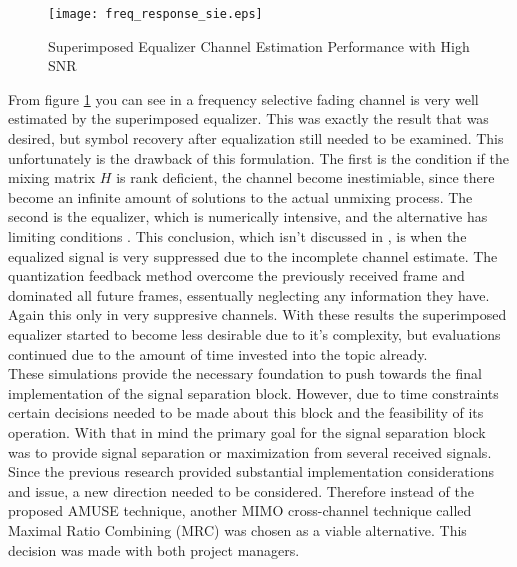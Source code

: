 \begin{figure}[!ht]\label{sie_freq}
\centering
\texttt{[image: freq\_response\_sie.eps]}
\caption{Superimposed Equalizer Channel Estimation Performance with High SNR}
\end{figure}

%

From figure \ref{sie_freq} you can see in a frequency selective fading channel is very well estimated by the superimposed equalizer.  This was exactly the result that was desired, but symbol recovery after equalization still needed to be examined. This unfortunately is the drawback of this formulation.  The first is the condition if the mixing matrix \(H\) is rank deficient, the channel become inestimiable,  since there become an infinite amount of solutions to the actual unmixing process.  The second is the equalizer, which is numerically intensive, and the alternative has limiting conditions \cite{Ghogho}.  This conclusion, which isn't discussed in \cite{Ghogho}, is when the equalized signal is very suppressed due to the incomplete channel estimate.  The quantization feedback method overcome the previously received frame and dominated all future frames, essentually neglecting any information they have.  Again this only in very suppresive channels.  With these results the superimposed equalizer started to become less desirable due to it's complexity, but evaluations continued due to the amount of time invested into the topic already.\\




These simulations provide the necessary foundation to push towards the final implementation of the signal separation block.  However, due to time constraints certain decisions needed to be made about this block and the feasibility of its operation.  With that in mind the primary goal for the signal separation block was to provide signal separation or maximization from several received signals.  Since the previous research provided substantial implementation considerations and issue, a new direction needed to be considered.  Therefore instead of the proposed AMUSE\cite{AMUSE} technique, another MIMO cross-channel technique called Maximal Ratio Combining (MRC) was chosen as a viable alternative.  This decision was made with both project managers.\\

